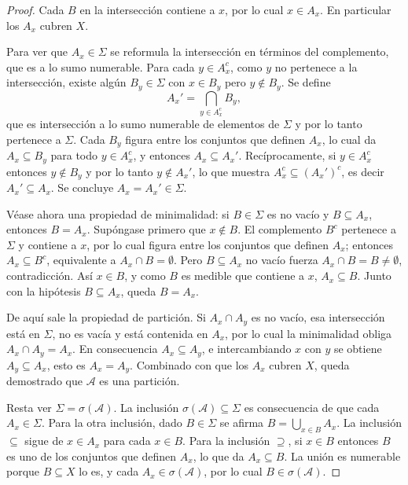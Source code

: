 \documentclass[11pt, a4paper]{article}
\begin{document}
\begin{proof}
Cada $B$ en la intersección contiene a $x$, por lo cual $x \in A_x$. En particular los $A_x$
cubren $X$.

Para ver que $A_x \in \Sigma$ se reformula la intersección en términos del complemento, que es
a lo sumo numerable. Para cada $y \in A_x^c$, como $y$ no pertenece a la intersección,
existe algún $B_y \in \Sigma$ con $x \in B_y$ pero $y \notin B_y$. Se define
$$ A_x' = \bigcap_{y \in A_x^c} B_y, $$
que es intersección a lo sumo numerable de elementos de $\Sigma$ y por lo tanto pertenece a
$\Sigma$. Cada $B_y$ figura entre los conjuntos que definen $A_x$, lo cual da $A_x \subseteq B_y$
para todo $y \in A_x^c$, y entonces $A_x \subseteq A_x'$. Recíprocamente, si $y \in A_x^c$
entonces $y \notin B_y$ y por lo tanto $y \notin A_x'$, lo que muestra $A_x^c \subseteq (A_x')^c$,
es decir $A_x' \subseteq A_x$. Se concluye $A_x = A_x' \in \Sigma$.

Véase ahora una propiedad de minimalidad: si $B \in \Sigma$ es no vacío y $B \subseteq A_x$,
entonces $B = A_x$. Supóngase primero que $x \notin B$. El complemento $B^c$ pertenece a $\Sigma$
y contiene a $x$, por lo cual figura entre los conjuntos que definen $A_x$; entonces $A_x \subseteq
B^c$, equivalente a $A_x \cap B = \emptyset$. Pero $B \subseteq A_x$ no vacío fuerza $A_x \cap B
= B \ne \emptyset$, contradicción. Así $x \in B$, y como $B$ es medible que contiene a $x$,
$A_x \subseteq B$. Junto con la hipótesis $B \subseteq A_x$, queda $B = A_x$.

De aquí sale la propiedad de partición. Si $A_x \cap A_y$ es no vacío, esa intersección
está en $\Sigma$, no es vacía y está contenida en $A_x$, por lo cual la minimalidad obliga
$A_x \cap A_y = A_x$. En consecuencia $A_x \subseteq A_y$, e intercambiando $x$ con $y$ se
obtiene $A_y \subseteq A_x$, esto es $A_x = A_y$. Combinado con que los $A_x$ cubren $X$, queda
demostrado que $\mathcal{A}$ es una partición.

Resta ver $\Sigma = \sigma(\mathcal{A})$. La inclusión $\sigma(\mathcal{A}) \subseteq \Sigma$
es consecuencia de que cada $A_x \in \Sigma$. Para la otra inclusión, dado $B \in \Sigma$
se afirma $B = \bigcup_{x \in B} A_x$. La inclusión $\subseteq$ sigue de $x \in A_x$ para cada $x
\in B$. Para la inclusión $\supseteq$, si $x \in B$ entonces $B$ es uno de los conjuntos que
definen $A_x$, lo que da $A_x \subseteq B$. La unión es numerable porque $B \subseteq X$ lo es,
y cada $A_x \in \sigma(\mathcal{A})$, por lo cual $B \in \sigma(\mathcal{A})$.
\end{proof}
\end{document}
